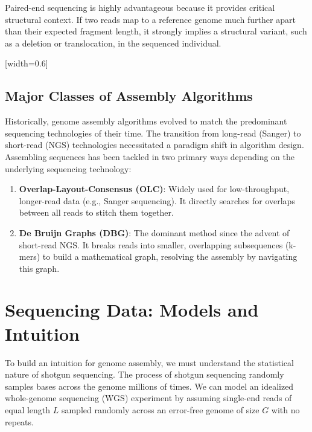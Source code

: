 \sta Paired-end sequencing is highly advantageous because it provides critical structural context. If two reads map to a reference genome much further apart than their expected fragment length, it strongly implies a structural variant, such as a deletion or translocation, in the sequenced individual.

[width=0.6\textwidth]

\subsection{Major Classes of Assembly Algorithms}
Historically, genome assembly algorithms evolved to match the predominant sequencing technologies of their time. The transition from long-read (Sanger) to short-read (NGS) technologies necessitated a paradigm shift in algorithm design. Assembling sequences has been tackled in two primary ways depending on the underlying sequencing technology:
\begin{enumerate}
    \item \textbf{Overlap-Layout-Consensus (OLC)}: Widely used for low-throughput, longer-read data (e.g., Sanger sequencing). It directly searches for overlaps between all reads to stitch them together.
    \item \textbf{De Bruijn Graphs (DBG)}: The dominant method since the advent of short-read NGS. It breaks reads into smaller, overlapping subsequences (k-mers) to build a mathematical graph, resolving the assembly by navigating this graph.
\end{enumerate}


\section{Sequencing Data: Models and Intuition}

To build an intuition for genome assembly, we must understand the statistical nature of shotgun sequencing. The process of shotgun sequencing randomly samples bases across the genome millions of times. We can model an idealized whole-genome sequencing (WGS) experiment by assuming single-end reads of equal length $L$ sampled randomly across an error-free genome of size $G$ with no repeats.

